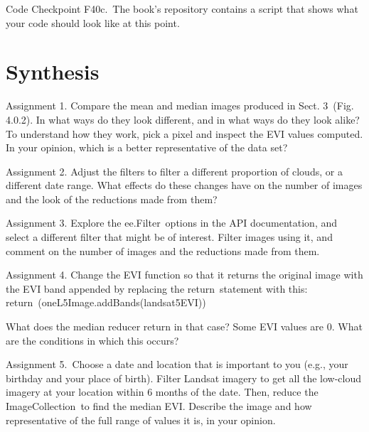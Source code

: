 \documentclass[
  letterpaper,
  DIV=11,
  numbers=noendperiod]{scrreprt}
\begin{document}
\begin{tcolorbox}[enhanced jigsaw, left=2mm, breakable, rightrule=.15mm, opacityback=0, colframe=quarto-callout-note-color-frame, colbacktitle=quarto-callout-note-color!10!white, arc=.35mm, opacitybacktitle=0.6, toptitle=1mm, colback=white, leftrule=.75mm, title=\textcolor{quarto-callout-note-color}{\faInfo}\hspace{0.5em}{Note}, toprule=.15mm, bottomtitle=1mm, titlerule=0mm, bottomrule=.15mm, coltitle=black]

Code Checkpoint F40c.~The book's repository contains a script that shows
what your code should look like at this point.

\end{tcolorbox}

\hypertarget{synthesis-3}{%
\section*{Synthesis}\label{synthesis-3}}


Assignment 1. Compare the mean and median images produced in Sect.
3~(Fig. 4.0.2). In what ways do they look different, and in what ways do
they look alike? To understand how they work, pick a pixel and inspect
the EVI values computed. In your opinion, which is a better
representative of the data set?

Assignment 2. Adjust the filters to filter a different proportion of
clouds, or a different date range. What effects do these changes have on
the number of images and the look of the reductions made from them?

Assignment 3. Explore the ee.Filter~options in the API documentation,
and select a different filter that might be of interest. Filter images
using it, and comment on the number of images and the reductions made
from them.

Assignment 4. Change the EVI function so that it returns the original
image with the EVI band appended by replacing the return~statement with
this: return~(oneL5Image.addBands(landsat5EVI))

What does the median reducer return in that case? Some EVI values are 0.
What are the conditions in which this occurs? ~

Assignment 5.~Choose a date and location that is important to you (e.g.,
your birthday and your place of birth). Filter Landsat imagery to get
all the low-cloud imagery at your location within 6 months of the date.
Then, reduce the ImageCollection~to find the median EVI. Describe the
image and how representative of the full range of values it is, in your
opinion.
\end{document}
